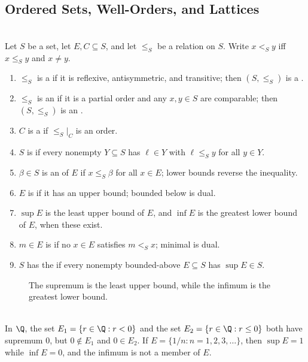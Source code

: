 \subsection{Ordered Sets, Well-Orders, and Lattices}

\begin{definition} \label{def:ordered-set-vocabulary} \\
Let $S$ be a set, let $E,C\subseteq S$, and let $\leq_S$ be a relation on $S$. Write $x<_Sy$ iff $x\leq_Sy$ and $x\neq y$.
\begin{enumerate}[label=(\roman*)]
\setlength{\itemsep}{0pt}
\item $\leq_S$ is a  if it is reflexive, antisymmetric, and transitive; then $(S,\leq_S)$ is a .
\item $\leq_S$ is an  if it is a partial order and any $x,y\in S$ are comparable; then $(S,\leq_S)$ is an .
\item $C$ is a  if $\leq_S|_C$ is an order.
\item $S$ is  if every nonempty $Y\subseteq S$ has $\ell\in Y$ with $\ell\leq_Sy$ for all $y\in Y$.
\item $\beta\in S$ is an  of $E$ if $x\leq_S\beta$ for all $x\in E$; lower bounds reverse the inequality.
\item $E$ is  if it has an upper bound; bounded below is dual.
\item $\sup E$ is the least upper bound of $E$, and $\inf E$ is the greatest lower bound of $E$, when these exist.
\item $m\in E$ is  if no $x\in E$ satisfies $m<_Sx$; minimal is dual.
\item $S$ has the  if every nonempty bounded-above $E\subseteq S$ has $\sup E\in S$.
\end{enumerate}
\end{definition}

\begin{figure}[H]
  \centering
  
  \caption{The supremum is the least upper bound, while the infimum is the greatest lower bound.}
  \label{fig:supremum-infimum-bounds}
\end{figure}

\begin{example} \label{ex:supremum-need-not-be-attained} \\
In $\Q$, the set $E_1=\{r\in\Q:r<0\}$ and the set $E_2=\{r\in\Q:r\leq0\}$ both have supremum $0$, but $0\notin E_1$ and $0\in E_2$. If $E=\{1/n:n=1,2,3,\ldots\}$, then $\sup E=1$ while $\inf E=0$, and the infimum is not a member of $E$.
\end{example}

